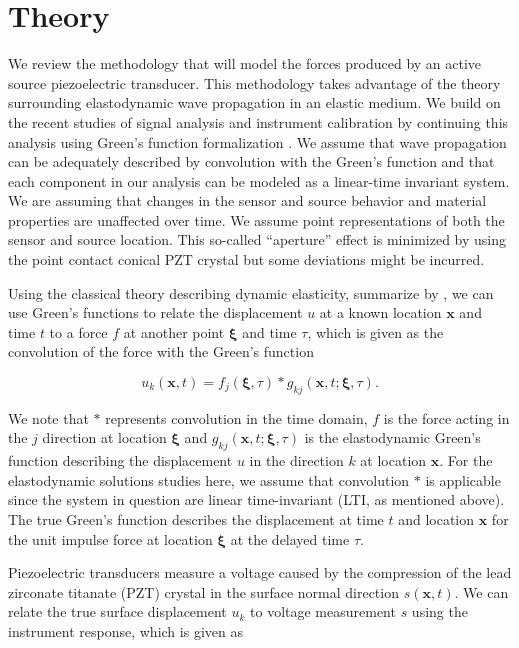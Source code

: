 \documentclass[preprint,3p, 11pt,authoryear]{elsarticle}
\begin{document}
\section{Theory}
\label{theo}
We review the methodology that will model the forces produced by an active source piezoelectric transducer.  This methodology takes advantage of the theory surrounding elastodynamic wave propagation in an elastic medium.  We build on the recent studies of signal analysis and instrument calibration by \citet{McLaksey2012} continuing this analysis using Green's function formalization \citep{Aki2002, Johnson1974}. We assume that wave propagation can be adequately described by convolution with the Green's function and that each component in our analysis can be modeled as a linear-time invariant system.  We are assuming that changes in the sensor and source behavior and material properties are unaffected over time.  We assume point representations of both the sensor and source location. This so-called ``aperture'' effect is minimized by using the point contact conical PZT crystal but some deviations might be incurred.

Using the classical theory describing dynamic elasticity, summarize by \citet{Aki2002}, we can use Green's functions to relate the displacement $u$ at a known location $\mathbf{x}$ and time $t$ to a force $f$ at another point $\mathbf{\xi}$ and time $\tau$, which is given as the convolution of the force with the Green's function

\begin{equation}
\label{eq1}
           u_{k}\left( \mathbf{x}, t \right)  =  
            f_{j}\left( \mathbf{\xi}, \tau \right) \ast 
            g_{kj}\left( \mathbf{x}, t;\mathbf{\xi}, \tau \right).
\end{equation}

\noindent We note that $\ast$ represents convolution in the time domain, $f$ is the force acting in the $j$ direction at location $\mathbf{\xi}$ and $g_{kj}\left( \mathbf{x}, t;\mathbf{\xi}, \tau \right)$ is the elastodynamic Green's function describing the displacement $u$ in the direction $k$ at location $\mathbf{x}$. For the elastodynamic solutions studies here, we assume that convolution $\ast$ is applicable since the system in question are linear time-invariant (LTI, as mentioned above). The true Green's function describes the displacement at time $t$ and location $\mathbf{x}$ for the unit impulse force at location $\mathbf{\xi}$ at the delayed time $\tau$. 

Piezoelectric transducers measure a voltage caused by the compression of the lead zirconate titanate (PZT) crystal in the surface normal direction $s\left( \mathbf{x}, t \right)$. We can relate the true surface displacement $u_{k}$ to voltage measurement $s$ using the instrument response, which is given as
\end{document}
